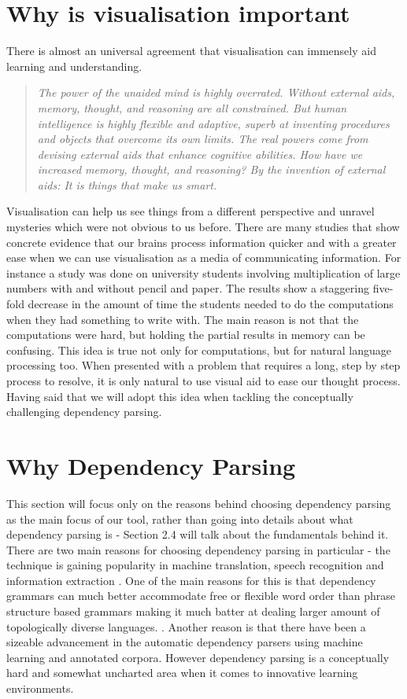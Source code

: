 \documentclass[bsc,frontabs,twoside,singlespacing,parskip,deptrepor]{infthesis}
\begin{document}
\section{Why is visualisation important}
There is almost an universal agreement that visualisation can immensely aid learning and understanding.
\begin{quote}
\textit{The power of the unaided mind is highly overrated. Without external aids, memory, thought, and reasoning are all constrained. But human intelligence is highly flexible and adaptive, superb at inventing procedures and objects that overcome its own limits. The real powers come from devising external aids that enhance cognitive abilities. How have we increased memory, thought, and reasoning? By the invention of external aids: It is things that make us smart.}\cite[Norman 1993, Chapter 3]{P8}
\end{quote}
Visualisation can help us see things from a different perspective and unravel mysteries which were not obvious to us before. There are many studies that show concrete evidence that our brains process information quicker and with a greater ease when we can use visualisation as a media of communicating information. For instance a study was done on university students involving multiplication of large numbers with and without pencil and paper. The results show a staggering  five-fold decrease in the amount of time the students needed to do the computations when they had something to write with.\cite{P6} The main reason is not that the computations were hard, but holding the partial results in memory can be confusing.
This idea is true not only for computations, but for natural language processing too. When presented with a problem that requires a long, step by step process to resolve, it is only natural to use visual aid to ease our thought process. Having said that we will adopt this idea when tackling the conceptually challenging dependency parsing. 

\section{Why Dependency Parsing}
This section will focus only on the reasons behind choosing dependency parsing as the main focus of our tool, rather than going into details about what dependency parsing is - Section 2.4 will talk about the fundamentals behind it.
There are two main reasons for choosing dependency parsing in particular - the technique is gaining popularity in machine translation\cite{galley2009quadratic}, speech recognition and information extraction \cite{culotta2004dependency}. One of the main reasons for this is that dependency grammars can much better accommodate free or flexible word order than phrase structure based grammars making it much batter at dealing larger amount of topologically diverse languages. \cite{parsingsynthesis}. Another reason is that there have been a sizeable advancement in the automatic dependency parsers using machine learning and annotated corpora. However dependency parsing is a conceptually hard and somewhat uncharted area when it comes to innovative learning environments.
\end{document}
